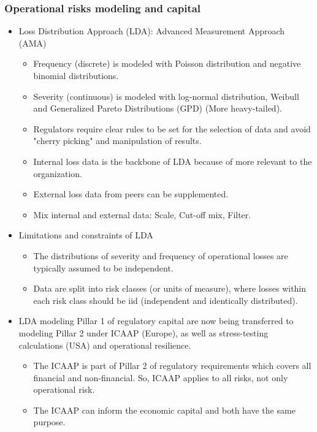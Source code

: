 \subsubsection{Operational risks modeling and capital}
\begin{itemize}
\item Loss Distribution Approach (LDA): Advanced Measurement Approach (AMA)
    \begin{itemize}
    \item Frequency (discrete) is modeled with Poisson distribution and negative binomial distributions.
    \item  Severity (continuous) is modeled with log-normal distribution, Weibull and Generalized Pareto Distributions (GPD) (More heavy-tailed).
    \item Regulators require clear rules to be set for the selection of data and avoid "cherry picking" and manipulation of results.
    \item  Internal loss data is the backbone of LDA because of more relevant to the organization.
    \item  External loss data from peers can be supplemented.
    \item  Mix internal and external data: Scale, Cut-off mix, Filter. 
    \end{itemize}
\item Limitations and constraints of LDA 
    \begin{itemize}
    \item The distributions of severity and frequency of operational losses are typically assumed to be independent.
    \item  Data are split into risk classes (or units of measure), where losses within each risk class should be iid (independent and identically distributed).
    \end{itemize}
\item LDA modeling Pillar 1 of regulatory capital are now being transferred to modeling Pillar 2 under ICAAP (Europe), as well as stress-testing calculations (USA) and operational resilience.
    \begin{itemize}
    \item The ICAAP is part of Pillar 2 of regulatory requirements which covers all financial and non-financial. So, ICAAP applies to all risks, not only operational risk.
    \item  The ICAAP can inform the economic capital and both have the same purpose.
    \end{itemize}
\end{itemize}


